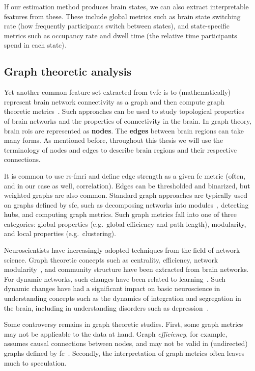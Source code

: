 If our estimation method produces brain states, we can also extract interpretable features from these.
These include global metrics such as brain state switching rate (how frequently participants switch between states),
and state-specific metrics such as occupancy rate and dwell time (the relative time participants spend in each state).

\subsection{Graph theoretic analysis}\label{subsec:graph-theoretic-analysis}

Yet another common feature set extracted from \gls{tvfc} is to (mathematically) represent brain network connectivity as a graph and then compute graph theoretic metrics~\parencite{Sporns2011}.
Such approaches can be used to study topological properties of brain networks and the properties of connectivity in the brain.
In graph theory, brain \glspl{roi} are represented as \textbf{nodes}.
The \textbf{edges} between brain regions can take many forms.
As mentioned before, throughout this thesis we will use the terminology of nodes and edges to describe brain regions and their respective connections.

It is common to use \gls{rs-fmri} and define edge strength as a given \gls{fc} metric (often, and in our case as well, correlation).
Edges can be thresholded and binarized, but weighted graphs are also common.
Standard graph approaches are typically used on graphs defined by \gls{sfc}, such as decomposing networks into modules~\parencite{Betzel2016}, detecting hubs, and computing graph metrics.
Such graph metrics fall into one of three categories: global properties (e.g.~global efficiency and path length), modularity, and local properties (e.g.~clustering).

Neuroscientists have increasingly adopted techniques from the field of network science.
Graph theoretic concepts such as centrality, efficiency, network modularity~\parencite{Zalesky2014}, and community structure have been extracted from brain networks.
For dynamic networks, such changes have been related to learning~\parencite{Bassett2011}.
Such dynamic changes have had a significant impact on basic neuroscience in understanding concepts such as the dynamics of integration and segregation in the brain, including in understanding disorders such as depression~\parencite{Gong2015}.

Some controversy remains in graph theoretic studies.
First, some graph metrics may not be applicable to the data at hand.
Graph \emph{efficiency}, for example, assumes causal connections between nodes, and may not be valid in (undirected) graphs defined by \gls{fc}~\parencite{Chen2017}.
Secondly, the interpretation of graph metrics often leaves much to speculation.

